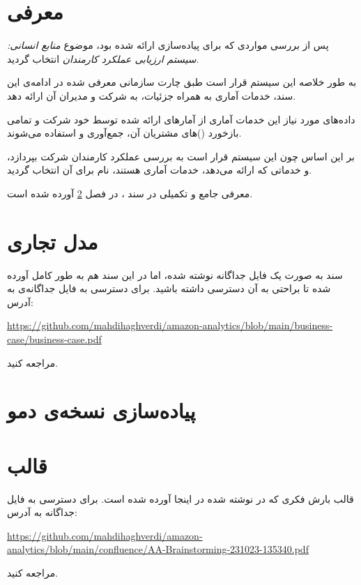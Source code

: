 \documentclass[11pt, oneside]{book}
\newcommand{\amz}{\lr{Amazon} }
\begin{document}
\frontmatter

\tableofcontents
\mainmatter

\chapter{معرفی}
    پس از بررسی مواردی که برای پیاده‌سازی ارائه شده بود، موضوع \textit{منابع انسانی:‌ سیستم ارزیابی عملکرد کارمندان} انتخاب گردید.
    
    به طور خلاصه این سیستم قرار است طبق چارت سازمانی معرفی شده در ادامه‌ی این سند، خدمات آماری به همراه جزئیات، به شرکت \amz و مدیران آن ارائه دهد. 
    
    داده‌های مورد نیاز این خدمات آماری از آمار‌های ارائه شده توسط خود شرکت \amz و تمامی بازخورد ()های مشتریان آن، جمع‌آوری و استفاده می‌شوند.
    
    بر این اساس چون این سیستم قرار است به بررسی عملکرد کارمندان شرکت \amz بپردازد، و خدماتی که ارائه می‌دهد، خدمات آماری هستند، نام  برای آن انتخاب گردید.
    
    معرفی جامع و تکمیلی در سند ، در فصل \ref{business-case} آورده شده است.
    
\chapter{مدل تجاری }\label{business-case}
سند  به صورت یک فایل  جداگانه نوشته شده، اما در این سند هم به طور کامل آورده شده تا براحتی به آن دسترسی داشته باشید. برای دسترسی به فایل جداگانه‌ی  به آدرس:
\begin{flushleft}
    \url{https://github.com/mahdihaghverdi/amazon-analytics/blob/main/business-case/business-case.pdf}
\end{flushleft}
مراجعه کنید.



\chapter{پیاده‌سازی نسخه‌ی دمو}
\chapter{قالب }
قالب بارش فکری که در  نوشته شده در اینجا آورده شده است. برای دسترسی به فایل جداگانه به آدرس:
\begin{flushleft}
    \url{https://github.com/mahdihaghverdi/amazon-analytics/blob/main/confluence/AA-Brainstorming-231023-135340.pdf}
\end{flushleft}
مراجعه کنید.


\end{document}
